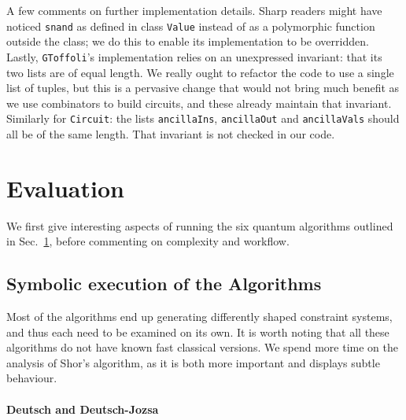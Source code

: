 \documentclass[sigplan,screen]{acmart}
\theoremstyle{definition}
\begin{document}
A few comments on further implementation details. Sharp readers might have noticed
\texttt{snand} as defined in class \texttt{Value} instead of as a polymorphic function
outside the class; we do this to enable its implementation to be overridden.
Lastly, \texttt{GToffoli}'s implementation relies on an unexpressed invariant: that its
two lists are of equal length. We really ought to refactor the code to use a single
list of tuples, but this is a pervasive change that would not bring much benefit as
we use combinators to build circuits, and these already maintain that invariant.
Similarly for \texttt{Circuit}: the lists \texttt{ancillaIns}, \texttt{ancillaOut}
and \texttt{ancillaVals} should all be of the same length. That invariant is not
checked in our code.


\section{Evaluation}
\label{sec5}

We first give interesting aspects of running the six quantum algorithms
outlined in Sec.~\ref{sec5}, before commenting on complexity and workflow.

\subsection{Symbolic execution of the Algorithms}

Most of the algorithms end up generating differently shaped constraint
systems, and thus each need to be examined on its own. It is worth noting
that all these algorithms do not have known fast classical versions.
We spend more time on the analysis of Shor's algorithm, as it is both
more important and displays subtle behaviour.

\paragraph*{Deutsch and Deutsch-Jozsa}
\end{document}
